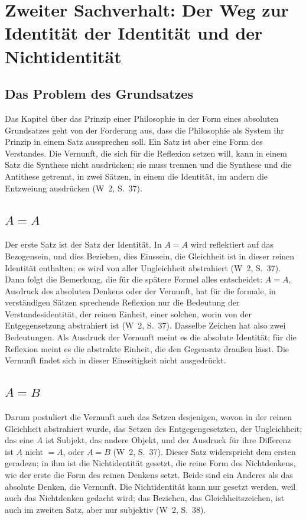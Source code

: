\documentclass[11pt,a4paper]{article}
\newcommand{\Werke}[1]{(W~2, S.~#1)}
\begin{document}
\section{Zweiter Sachverhalt: Der Weg zur Identität der Identität und der Nichtidentität}

\subsection{Das Problem des Grundsatzes}

Das Kapitel über das Prinzip einer Philosophie in der Form eines absoluten Grundsatzes geht von der Forderung aus, dass die Philosophie als System ihr Prinzip in einem Satz aussprechen soll. Ein Satz ist aber eine Form des Verstandes. Die Vernunft, die sich für die Reflexion setzen will, kann in einem Satz die Synthese nicht ausdrücken; sie muss trennen und \glqq die Synthese und die Antithese getrennt, in zwei Sätzen, in einem die Identität, im andern die Entzweiung ausdrücken\grqq{} \Werke{37}.

\subsection{$A = A$}

Der erste Satz ist der Satz der Identität. In $A = A$ \glqq wird reflektiert auf das Bezogensein, und dies Beziehen, dies Einssein, die Gleichheit ist in dieser reinen Identität enthalten; es wird von aller Ungleichheit abstrahiert\grqq{} \Werke{37}. Dann folgt die Bemerkung, die für die spätere Formel alles entscheidet: $A = A$, \glqq Ausdruck des absoluten Denkens oder der Vernunft\grqq{}, hat \glqq für die formale, in verständigen Sätzen sprechende Reflexion nur die Bedeutung der Verstandesidentität, der reinen Einheit\grqq{}, einer solchen, \glqq worin von der Entgegensetzung abstrahiert ist\grqq{} \Werke{37}. Dasselbe Zeichen hat also zwei Bedeutungen. Als Ausdruck der Vernunft meint es die absolute Identität; für die Reflexion meint es die abstrakte Einheit, die den Gegensatz draußen lässt. Die Vernunft findet sich in dieser Einseitigkeit nicht ausgedrückt.

\subsection{$A = B$}

Darum postuliert die Vernunft \glqq auch das Setzen desjenigen, wovon in der reinen Gleichheit abstrahiert wurde, das Setzen des Entgegengesetzten, der Ungleichheit; das eine $A$ ist Subjekt, das andere Objekt, und der Ausdruck für ihre Differenz ist $A$ nicht $= A$, oder $A = B$\grqq{} \Werke{37}. Dieser Satz widerspricht dem ersten geradezu; in ihm ist die Nichtidentität gesetzt, \glqq die reine Form des Nichtdenkens\grqq{}, wie der erste die Form des reinen Denkens setzt. Beide sind \glqq ein Anderes als das absolute Denken, die Vernunft\grqq{}. Die Nichtidentität kann nur gesetzt werden, weil auch das Nichtdenken gedacht wird; das Beziehen, das Gleichheitszeichen, ist auch im zweiten Satz, aber nur subjektiv \Werke{38}.
\end{document}
